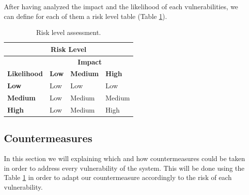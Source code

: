 \documentclass[a4paper,10pt]{article}
\begin{document}
After having analyzed the impact and the likelihood of each vulnerabilities, we can define for each of them a risk level table (Table \ref{tab:risk}).

\begin{table}[!h]
	\centering
	\begin{tabular}{|l|l|l|l|}
		\hline
		\multicolumn{4}{|c|}{\textbf{Risk Level}} \\
		\hline
		 & \multicolumn{3}{|c|}{\textbf{Impact}}  \\ \hline
		\textbf{Likelihood} & \textbf{Low} & \textbf{Medium} & \textbf{High} \\ \hline
		\textbf{Low}& Low & Low & Low \\ \hline
		\textbf{Medium} & Low & Medium & Medium \\ \hline
		\textbf{High} & Low & Medium & High \\ \hline
	\end{tabular}
	\caption{Risk level assessment.}
	\label{tab:risk}
\end{table} 



\subsection{Countermeasures}
In this section we will explaining which and how countermeasures could be taken in order to address every vulnerability of the system. This will be done using the Table \ref{tab:risk} in order to adapt our countermeasure accordingly to the risk of each vulnerability.
\end{document}
